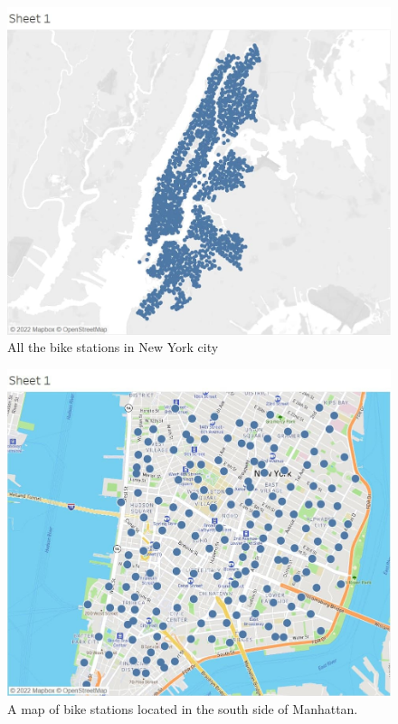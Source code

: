 \documentclass[sigconf,authordraft]{acmart}
\begin{document}
\begin{figure}
\centering
\includegraphics[scale=0.5]{Images/P1.jpg}
\caption{All the bike stations in New York city}
\label{Graph1}
\end{figure}

\begin{figure}
\centering
\includegraphics[scale=0.47]{Images/P2.jpg}
\caption{A  map of bike stations located in the south side of Manhattan.}
\label{Graph2}
\end{figure}
\end{document}
